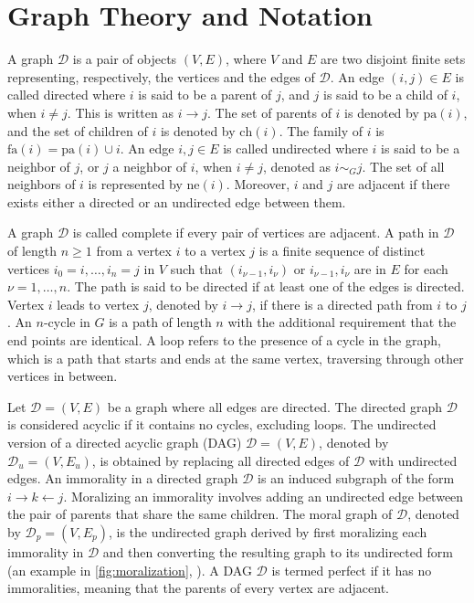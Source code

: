 \documentclass{report}
\begin{document}
\section{Graph Theory and Notation}

A graph $\mathcal{D}$ is a pair of objects $(V, E)$, where $V$ and $E$ are two disjoint finite sets representing, respectively, the vertices and the edges of $\mathcal{D}$. An edge $(i, j) \in E$ is called directed where $i$ is said to be a parent of $j$, and $j$ is said to be a child of $i$, when $i \neq j$. This is written as $i \rightarrow j$. The set of parents of $i$ is denoted by $\text{pa}(i)$, and the set of children of $i$ is denoted by $\text{ch}(i)$. The family of $i$ is $\text{fa}(i) = \text{pa}(i) \cup {i}$. An edge ${i, j} \in E$ is called undirected where $i$ is said to be a neighbor of $j$, or $j$ a neighbor of $i$, when $i \neq j$, denoted as $i \sim_G j$. The set of all neighbors of $i$ is represented by $\text{ne}(i)$. Moreover, $i$ and $j$ are adjacent if there exists either a directed or an undirected edge between them. 

A graph $\mathcal{D}$ is called complete if every pair of vertices are adjacent. A path in $\mathcal{D}$ of length $n \geq 1$ from a vertex $i$ to a vertex $j$ is a finite sequence of distinct vertices $i_0 = i, \ldots, i_n = j$ in $V$ such that $(i_{\nu-1}, i_{\nu})$ or ${i_{\nu-1}, i_{\nu}}$ are in $E$ for each $\nu = 1, \ldots, n$. The path is said to be directed if at least one of the edges is directed. Vertex $i$ leads to vertex $j$, denoted by $i \rightarrow j$, if there is a directed path from $i$ to $j$. An $n$-cycle in $G$ is a path of length $n$ with the additional requirement that the end points are identical. A loop refers to the presence of a cycle in the graph, which is a path that starts and ends at the same vertex, traversing through other vertices in between. \hfill \break

Let $\mathcal{D} = (V, E)$ be a graph where all edges are directed. The directed graph $\mathcal{D}$ is considered acyclic if it contains no cycles, excluding loops. The undirected version of a directed acyclic graph (DAG) $\mathcal{D} = (V, E)$, denoted by $\mathcal{D}_u = (V, E_u)$, is obtained by replacing all directed edges of $\mathcal{D}$ with undirected edges. An immorality in a directed graph $\mathcal{D}$ is an induced subgraph of the form $i \rightarrow k \leftarrow j$. Moralizing an immorality involves adding an undirected edge between the pair of parents that share the same children. The moral graph of $\mathcal{D}$, denoted by $\mathcal{D}_p = (V, E_p)$, is the undirected graph derived by first moralizing each immorality in $\mathcal{D}$ and then converting the resulting graph to its undirected form (an example in  \ref{fig:moralization}, \citet{li2019complexity}). A DAG $\mathcal{D}$ is termed perfect if it has no immoralities, meaning that the parents of every vertex are adjacent. 
\end{document}
